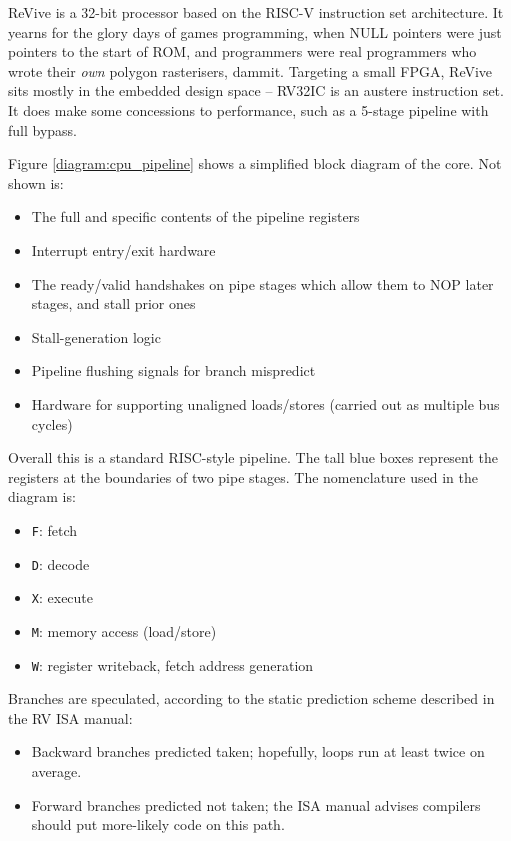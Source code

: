 \documentclass{article}
\begin{document}
ReVive is a 32-bit processor based on the RISC-V instruction set architecture. It yearns for the glory days of games programming, when NULL pointers were just pointers to the start of ROM, and programmers were real programmers who wrote their \textit{own} polygon rasterisers, dammit. Targeting a small FPGA, ReVive sits mostly in the embedded design space -- RV32IC is an austere instruction set. It does make some concessions to performance, such as a 5-stage pipeline with full bypass.

Figure \ref{diagram:cpu_pipeline} shows a simplified block diagram of the core. Not shown is:
\begin{itemize}
\item The full and specific contents of the pipeline registers
\item Interrupt entry/exit hardware
\item The ready/valid handshakes on pipe stages which allow them to NOP later stages, and stall prior ones
\item Stall-generation logic
\item Pipeline flushing signals for branch mispredict
\item Hardware for supporting unaligned loads/stores (carried out as multiple bus cycles)
\end{itemize}

Overall this is a standard RISC-style pipeline. The tall blue boxes represent the registers at the boundaries of two pipe stages. The nomenclature used in the diagram is:

\begin{itemize}
\item \texttt{F}: fetch
\item \texttt{D}: decode
\item \texttt{X}: execute
\item \texttt{M}: memory access (load/store)
\item \texttt{W}: register writeback, fetch address generation
\end{itemize}

Branches are speculated, according to the static prediction scheme described in the RV ISA manual:

\begin{itemize}
\item Backward branches predicted taken; hopefully, loops run at least twice on average.
\item Forward branches predicted not taken; the ISA manual advises compilers should put more-likely code on this path.
\end{itemize}
\end{document}
